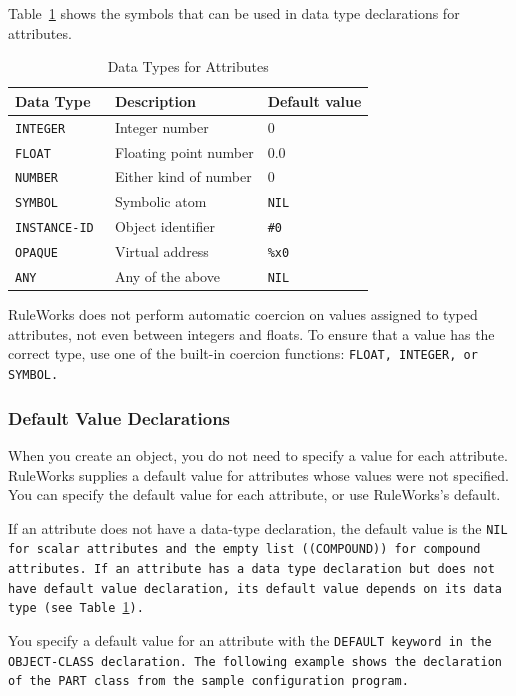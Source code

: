 Table~\ref{t:2-2} shows the symbols that can be used in data type
declarations for attributes.

\begin{table}[h]
  \centering
  \begin{tabular}{lll}
    \toprule
    Data Type & Description & Default value \\
    \midrule
    \tt{INTEGER}     & Integer number        & 0             \\
    \tt{FLOAT}       & Floating point number & 0.0           \\
    \tt{NUMBER}      & Either kind of number & 0             \\
    \tt{SYMBOL}      & Symbolic atom         & \tt{NIL}           \\
    \tt{INSTANCE-ID} & Object identifier     & \verb|#0|     \\
    \tt{OPAQUE}      & Virtual address       & \verb|%x0|    \\
    \tt{ANY}         & Any of the above      & \tt{NIL}           \\  
    \bottomrule
  \end{tabular}
  \caption{Data Types for Attributes}
  \label{t:2-2}
\end{table}

RuleWorks does not perform automatic coercion on values
assigned to typed attributes, not even between integers and
floats. To ensure that a value has the correct type, use one
of the built-in coercion functions: \tt{FLOAT}, \tt{INTEGER}, or
\tt{SYMBOL}.

\subsubsection*{Default Value Declarations}

When you create an object, you do not need to specify a value
for each attribute. RuleWorks supplies a default value for
attributes whose values were not specified. You can specify
the default value for each attribute, or use RuleWorks's
default.

If an attribute does not have a data-type declaration, the default
value is the \tt{NIL} for scalar attributes and the empty list
(\tt{(COMPOUND)}) for compound attributes. If an attribute has a data
type declaration but does not have default value declaration, its
default value depends on its data type (see Table~\ref{t:2-2}).

You specify a default value for an attribute with the \tt{DEFAULT}
keyword in the \tt{OBJECT-CLASS} declaration. The following
example shows the declaration of the \tt{PART} class from the
sample configuration program.

